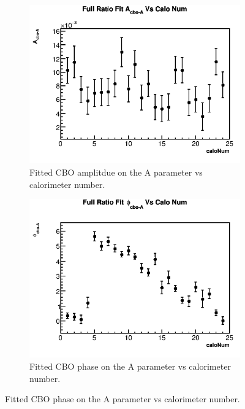 \begin{figure}[h]
\begin{subfigure}[t]{0.4\textwidth}
	    \end{subfigure}%
	    \vspace{4mm}
	    \begin{subfigure}[t]{0.4\textwidth}
		    \centering
			\includegraphics[width=\textwidth]{RatioCBOFit_A_cbo-A_Vs_Calo_Canv}
		    \caption{Fitted CBO amplitdue on the A parameter vs calorimeter number.}
	    \end{subfigure}
	    \hspace{4mm}
	    \begin{subfigure}[t]{0.4\textwidth}
		    \centering
			\includegraphics[width=\textwidth]{RatioCBOFit_phi_cbo-A_Vs_Calo_Canv}
		    \caption{Fitted CBO phase on the A parameter vs calorimeter number.}

\end{subfigure}
\end{figure}
